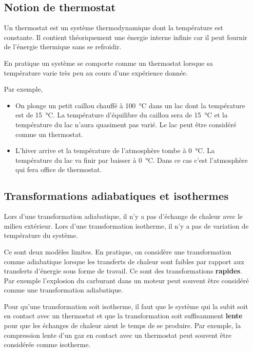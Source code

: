 \documentclass{cours}
\begin{document}
\subsection{Notion de thermostat}%
\label{sub:notion_de_thermostat}

Un thermostat est un système thermodynamique dont la température est constante. Il contient théoriquement une énergie interne infinie car il peut fournir de l'énergie thermique sans se refroidir.

En pratique un système se comporte comme un thermostat lorsque sa température varie très peu au cours d'une expérience donnée.

Par exemple, 
\begin{itemize}
  \item On plonge un petit caillou chauffé à \SI{100}{\celsius} dans un lac dont la température est de \SI{15}{\celsius}. La température d'équilibre du caillou sera de \SI{15}{\celsius} et la température du lac n'aura quasiment pas varié. Le lac peut être considéré comme un thermostat.
  \item L'hiver arrive et la température de l'atmosphère tombe à \SI{0}{\celsius}. La température du lac va finir par baisser à \SI{0}{\celsius}. Dans ce cas c'est l'atmosphère qui fera office de thermostat.
\end{itemize}

  \subsection{Transformations adiabatiques et isothermes}%
  \label{sub:transformations_adiabatiques_et_isothermes}
  Lors d'une transformation adiabatique, il n'y a pas d'échange de chaleur avec le milieu extérieur. Lors d'une transformation isotherme, il n'y a pas de variation de température du système. 

  Ce sont deux modèles limites. En pratique, on considère une transformation comme adiabatique lorsque les transferts de chaleur sont faibles par rapport aux transferts d'énergie sous forme de travail. Ce sont des transformations \textbf{rapides}. Par exemple l'explosion du carburant dans un moteur peut souvent être considéré comme une transformation adiabatique.

  Pour qu'une transformation soit isotherme, il faut que le système qui la subit soit en contact avec un thermostat et que la transformation soit suffisamment \textbf{lente} pour que les échanges de chaleur aient le temps de se produire. Par exemple, la compression lente d'un gaz en contact avec un thermostat peut souvent être considérée comme isotherme.
  
\end{document}
